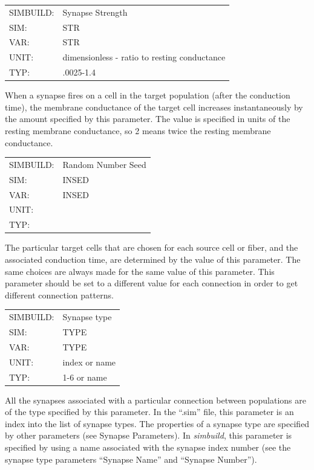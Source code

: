 \documentclass[12pt,openany,oneside]{book}
\newcommand{\prog}[1]{\textit{{#1}}}
\newcommand{\ext}[1]{{{``.#1''}}}
\newcommand{\inquotes}[1]{{{``#1''}}}
\begin{document}
\begin{flushleft}
\begin{tabular}{@{}ll@{}}
SIMBUILD: & Synapse Strength\\
SIM: & STR\\
VAR: & STR\\
UNIT: & dimensionless - ratio to resting conductance\\
TYP: & .0025-1.4\\
\end{tabular}
\end{flushleft}
\noindent
When a synapse fires on a cell in the target population (after the
conduction time), the membrane conductance of the target cell
increases instantaneously by the amount specified by this parameter.
The value is specified in units of the resting membrane conductance,
so 2 means twice the resting membrane conductance.
\filbreak
\vspace{\baselineskip}

\begin{flushleft}
\begin{tabular}{@{}ll@{}}
SIMBUILD: & Random Number Seed\\
SIM: & INSED\\
VAR: & INSED\\
UNIT: &\\
TYP: &\\
\end{tabular}
\end{flushleft}
\noindent
The particular target cells that are chosen for each source cell or
fiber, and the associated conduction time, are determined by the value
of this parameter. The same choices are always made for the same
value of this parameter. This parameter should be set to a different
value for each connection in order to get different connection
patterns.
\filbreak
\vspace{\baselineskip}

\begin{flushleft}
\begin{tabular}{@{}ll@{}}
SIMBUILD: & Synapse type\\
SIM: & TYPE\\
VAR: & TYPE\\
UNIT: & index or name\\
TYP: & 1-6 or name\\
\end{tabular}
\end{flushleft}
\noindent
All the synapses associated with a particular connection between
populations are of the type specified by this parameter. In the
\ext{sim} file, this parameter is an index into the list of synapse
types. The properties of a synapse type are specified by other
parameters (see Synapse Parameters). In \prog{simbuild}, this parameter is
specified by using a name associated with the synapse index number
(see the synapse type parameters \inquotes{Synapse Name} and \inquotes{Synapse
Number}).
\filbreak
\vspace{\baselineskip}
\end{document}
